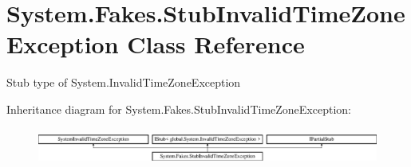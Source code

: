 \hypertarget{class_system_1_1_fakes_1_1_stub_invalid_time_zone_exception}{\section{System.\-Fakes.\-Stub\-Invalid\-Time\-Zone\-Exception Class Reference}
\label{class_system_1_1_fakes_1_1_stub_invalid_time_zone_exception}
}


Stub type of System.\-Invalid\-Time\-Zone\-Exception 


Inheritance diagram for System.\-Fakes.\-Stub\-Invalid\-Time\-Zone\-Exception\-:\begin{figure}[H]
\begin{center}
\leavevmode
\includegraphics[height=1.236203cm]{class_system_1_1_fakes_1_1_stub_invalid_time_zone_exception}
\end{center}
\end{figure}
